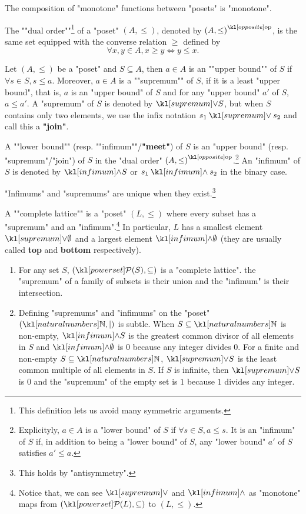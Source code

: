 \documentclass[main.tex]{subfiles}
\begin{document}
\begin{prop}
    The composition of "monotone" functions between "posets" is "monotone".
\end{prop}
\begin{defn}[Dual]
	\AP The ""dual order""\footnote{This definition lets us avoid many symmetric arguments.} of a "poset" $(A, \leq)$, denoted by $\op{(A, \leq)}$, is the same set equipped with the converse relation $\geq$ defined by \[\forall x,y \in A, x \geq y \Leftrightarrow y\leq x.\]
\end{defn}
\begin{defn}[Bounds]
	\AP Let $(A, \leq)$ be a "poset" and $S \subseteq A$, then $a \in A$ is an ""upper bound"" of $S$ if $\forall s \in S, s\leq a$. \AP Moreover, $a \in A$ is a ""supremum"" of $S$, if it is a least "upper bound", that is, $a$ is an "upper bound" of $S$ and for any "upper bound" $a'$ of $S$, $a\leq a'$. A "supremum" of $S$ is denoted by $\supremum S$, but when $S$ contains only two elements, we use the infix notation $s_1 \supremum s_2$ and call this a \textbf{"join"}.
	
	\AP A ""lower bound"" (resp. ""infimum""/\textbf{"meet"}) of $S$ is an "upper bound" (resp. "supremum"/"join") of $S$ in the "dual order" $\op{(A, \leq)}$.\footnote{Explicityly, $a\in A$ is a "lower bound" of $S$ if $\forall s\in S, a\leq s$. It is an "infimum" of $S$ if, in addition to being a "lower bound" of $S$, any "lower bound" $a'$ of $S$ satisfies $a' \leq a$.} An "infimum" of $S$ is denoted by $\infimum S$ or $s_1 \infimum s_2$ in the binary case.
\end{defn}
\begin{prop}
	"Infimums" and "supremums" are unique when they exist.\footnote{This holds by "antisymmetry".}
\end{prop}
\begin{defn}
	\AP A ""complete lattice"" is a "poset" $(L,\leq)$ where every subset has a "supremum" and an "infimum".\footnote{Notice that, we can see $\supremum$ and $\infimum$ as "monotone" maps from $(\mP(L),\subseteq)$ to $(L,\leq)$.} In particular, $L$ has a smallest element $\supremum \emptyset$ and a largest element $\infimum \emptyset$ (they are usually called \textbf{top} and \textbf{bottom} respectively).
\end{defn}
\begin{exmps}
    \begin{enumerate}
        \item For any set $S$, $(\mP(S), \subseteq)$ is a "complete lattice". the "supremum" of a family of subsets is their union and the "infimum" is their intersection.
        \item Defining "supremums" and "infimums" on the "poset" $(\N, \mid)$ is subtle. When $S \subseteq \N$ is non-empty, $\infimum S$ is the greatest common divisor of all elements in $S$ and $\infimum \emptyset$ is $0$ because any integer divides $0$. For a finite and non-empty $S \subseteq \N$, $\supremum S$ is the least common multiple of all elements in $S$. If $S$ is infinite, then $\supremum S$ is $0$ and the "supremum" of the empty set is $1$ because $1$ divides any integer.
    \end{enumerate}
\end{exmps}
\end{document}
